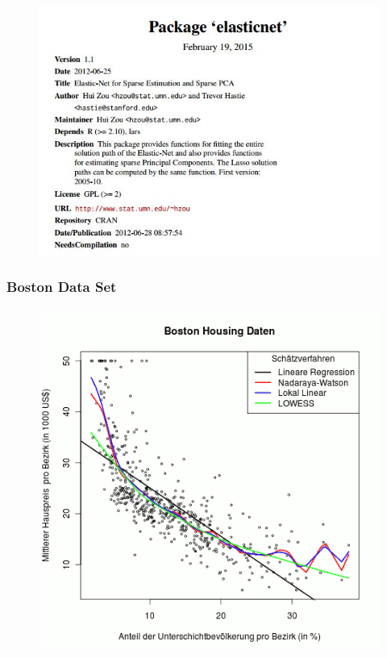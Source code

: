 \documentclass{beamer}
\begin{document}
\begin{frame}
	\begin{figure}
\centering
\includegraphics[width=1.05\linewidth]{images/CRAN-elasticnet}

\end{figure}

\end{frame}
\begin{frame}
\frametitle{Boston Data Set}
\begin{figure}
\centering
\includegraphics[width=0.8\linewidth]{images/LocalPolynomialRegression}


\end{figure}
\end{frame}
\end{document}
